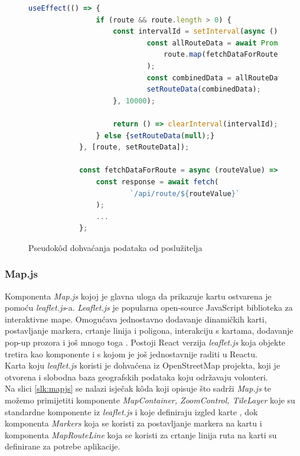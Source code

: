 \documentclass[zavrsnirad]{fer}
\begin{document}
\begin{figure}[H]
	\centering
	\begin{minipage}{0.9\linewidth}
		\begin{lstlisting}[language=JavaScript]			
			useEffect(() => {
				if (route && route.length > 0) {
					const intervalId = setInterval(async () => {
							const allRouteData = await Promise.all(
								route.map(fetchDataForRoute)
							);
							const combinedData = allRouteData.flat();
							setRouteData(combinedData);
					}, 10000);
					
					return () => clearInterval(intervalId);
				} else {setRouteData(null);}
			}, [route, setRouteData]);
			
			const fetchDataForRoute = async (routeValue) => {
				const response = await fetch(
						`/api/route/${routeValue}`
				);
				...
			};
		\end{lstlisting}
	\end{minipage}
	\caption{Pseudok\^od dohvaćanja podataka od poslužitelja}
	\label{slk:dohvatpodataka}
\end{figure}

\subsubsection{Map.js}
Komponenta \textit{Map.js} kojoj je glavna uloga da prikazuje kartu ostvarena je pomoću \textit{leaflet.js}-a.
\textit{Leaflet.js} je popularna open-source JavaScript biblioteka za interaktivne mape. Omogućava jednostavno dodavanje dinamičkih karti, postavljanje markera, crtanje linija i poligona, interakciju s kartama, dodavanje pop-up prozora i još mnogo toga \cite{leaflet}.
Postoji React verzija \textit{leaflet.js} koja objekte tretira kao komponente i s kojom je još jednostavnije raditi u Reactu.\\
Karta koju \textit{leaflet.js} koristi je dohvaćena iz OpenStreetMap projekta, koji je otvorena i slobodna baza geografskih podataka koju održavaju volonteri.\\

Na slici \ref{slk:mapjs} se nalazi isječak k\^oda koji opisuje što sadrži \textit{Map.js} te možemo primijetiti komponente \textit{MapContainer, ZoomControl, TileLayer} koje su standardne komponente iz \textit{leaflet.js} i koje definiraju izgled karte , dok komponenta \textit{Markers} koja se koristi za postavljanje markera na kartu i komponenta \textit{MapRouteLine} koja se koristi za crtanje linija ruta na karti su definirane za potrebe aplikacije.
\end{document}
